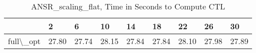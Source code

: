 \begin{table}
\centering
\caption{ANSR\_scaling\_flat, Time in Seconds to Compute CTL}
\label{ANSR_scaling_flat_CTL_time}
\begin{tabular}{lllllllll}
\toprule
{} &      2 &      6 &     10 &     14 &     18 &     22 &     26 &     30 \\
\midrule
full\textbackslash \_opt &  27.80 &  27.74 &  28.15 &  27.84 &  27.84 &  28.10 &  27.98 &  27.89 \\
\bottomrule
\end{tabular}
\end{table}
